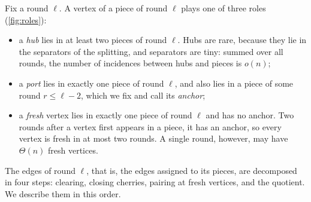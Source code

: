 \documentclass[11pt]{article}
\theoremstyle{definition}
\theoremstyle{remark}
\numberwithin{equation}{section}
\numberwithin{figure}{section}
\numberwithin{table}{section}
\begin{document}
Fix a round $\ell$. A vertex of a piece of round $\ell$ plays one of three roles
(\cref{fig:roles}):
\begin{itemize}[leftmargin=2em,itemsep=2pt]
\item a \emph{hub} lies in at least two pieces of round $\ell$. Hubs are rare,
because they lie in the separators of the splitting, and separators are tiny:
summed over all rounds, the number of incidences between hubs and pieces is
$o(n)$;
\item a \emph{port} lies in exactly one piece of round $\ell$, and also lies in
a piece of some round $r\le\ell-2$, which we fix and call its \emph{anchor};
\item a \emph{fresh} vertex lies in exactly one piece of round $\ell$ and has no
anchor. Two rounds after a vertex first appears in a piece, it has an anchor,
so every vertex is fresh in at most two rounds. A single round, however, may
have $\Theta(n)$ fresh vertices.
\end{itemize}
The edges of round $\ell$, that is, the edges assigned to its pieces, are
decomposed in four steps: clearing, closing
cherries, pairing at fresh vertices, and the quotient. We describe them in this
order.
\end{document}
